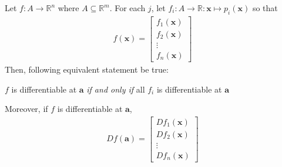 \documentclass[twoside,openright]{report}
\begin{document}
\newpage
\begin{theorem}
    Let $f: A \to \mathbb{R}^n$ where $A \subseteq \mathbb{R}^m$. For each $j$, let $f_i:A \to \mathbb{R}: \mathbf{x} \mapsto p_i(\mathbf{x})$ so that
    \begin{align*}
        f(\mathbf{x}) = 
        \begin{bmatrix}
            f_1(\mathbf{x}) \\
            f_2(\mathbf{x}) \\
            \vdots \\
            f_n(\mathbf{x})
        \end{bmatrix}
    \end{align*}
    Then, following equivalent statement be true:
    \begin{center}
        $f$ is differentiable at $\mathbf{a}$ \textit{if and only if}
        all $f_i$ is differentiable at $\mathbf{a}$
    \end{center}
    Moreover, if $f$ is differentiable at $\mathbf{a}$,
    \begin{align*}
        Df(\mathbf{a})
        = \begin{bmatrix}
            Df_1(\mathbf{x}) \\
            Df_2(\mathbf{x}) \\
            \vdots \\
            Df_n(\mathbf{x})
        \end{bmatrix}
    \end{align*}
\end{theorem}







\addparttoc{}
\end{document}
